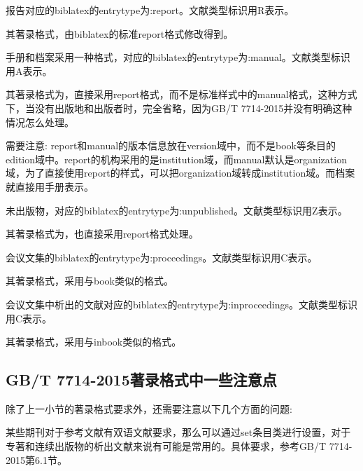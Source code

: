 \documentclass[11pt]{article} %
\begin{document}
\begin{refentry}{}{}
报告对应的biblatex的entrytype为:report。文献类型标识用R表示。

其著录格式，由biblatex的标准report格式修改得到。
\end{refentry}

\begin{refentry}{}{}
手册和档案采用一种格式，对应的biblatex的entrytype为:manual。文献类型标识用A表示。

其著录格式为，直接采用report格式，而不是标准样式中的manual格式，这种方式下，当没有出版地和出版者时，完全省略，因为GB/T 7714-2015并没有明确这种情况怎么处理。
\end{refentry}

需要注意: report和manual的版本信息放在version域中，而不是book等条目的edition域中。report的机构采用的是institution域，而manual默认是organization域，为了直接使用report的样式，可以把organization域转成institution域。而档案就直接用手册表示。

\begin{refentry}{}{}
未出版物，对应的biblatex的entrytype为:unpublished。文献类型标识用Z表示。

其著录格式为，也直接采用report格式处理。
\end{refentry}

\begin{refentry}{}{}
会议文集的biblatex的entrytype为:proceedings。文献类型标识用C表示。

其著录格式，采用与book类似的格式。
\end{refentry}

\begin{refentry}{}{}
会议文集中析出的文献对应的biblatex的entrytype为:inproceedings。文献类型标识用C表示。

其著录格式，采用与inbook类似的格式。
\end{refentry}

\subsection{GB/T 7714-2015著录格式中一些注意点}

除了上一小节的著录格式要求外，还需要注意以下几个方面的问题:

\begin{property}{}{}
某些期刊对于参考文献有双语文献要求，那么可以通过set条目类进行设置，对于专著和连续出版物的析出文献来说有可能是常用的。具体要求，参考GB/T 7714-2015第6.1节。
\end{property}
\end{document}

